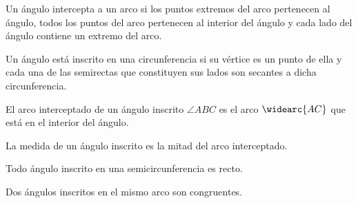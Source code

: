 \begin{definition}
    Un ángulo intercepta a un arco si los puntos extremos del arco pertenecen al ángulo, todos los puntos del arco pertenecen al interior del ángulo y cada lado del ángulo contiene un extremo del arco.
\end{definition}

\begin{definition}
    Un ángulo está inscrito en una circunferencia si su vértice es un punto de ella y cada una de las semirectas que constituyen sus lados son secantes a dicha circunferencia.
\end{definition}

\begin{definition}
    El arco interceptado de un ángulo inscrito $\angle{ABC}$ es el arco $\widearc{AC}$ que está en el interior del ángulo.
\end{definition}

\begin{theorem}
    La medida de un ángulo inscrito es la mitad del arco interceptado.

    \begin{figure}[!h]
        \centering
        
        \label{fig:theorem29}
    \end{figure}
    
\end{theorem}

\begin{theorem}
    Todo ángulo inscrito en una semicircunferencia es recto.

    \begin{figure}[!h]
        \centering
        
        \label{fig:theorem30}
    \end{figure}
    
\end{theorem}

\clearpage

\begin{theorem}
    Dos ángulos inscritos en el mismo arco son congruentes.

    \begin{figure}[!h]
        \centering
        
        \label{fig:theorem31}
    \end{figure}
    
\end{theorem}

